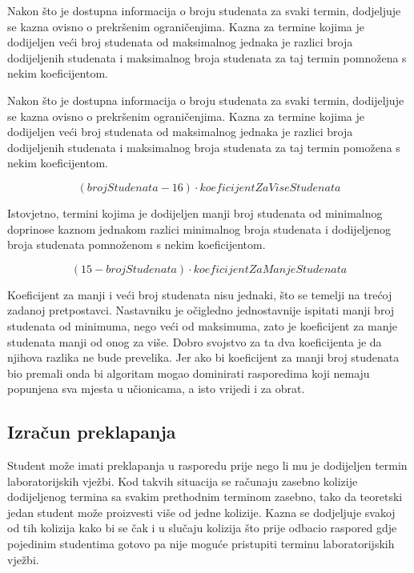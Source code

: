 \documentclass[times, utf8, zavrsni]{fer}
\begin{document}
Nakon što je dostupna informacija o broju studenata za svaki termin, dodjeljuje se kazna ovisno o prekršenim ograničenjima. Kazna za termine kojima je dodijeljen veći broj studenata od maksimalnog jednaka je razlici broja dodijeljenih studenata i maksimalnog broja studenata za taj termin pomnožena s nekim koeficijentom.

Nakon što je dostupna informacija o broju studenata za svaki termin, dodijeljuje se kazna ovisno o prekršenim ograničenjima. Kazna za termine kojima je dodijeljen veći broj studenata od maksimalnog jednaka je razlici broja dodijeljenih studenata i maksimalnog broja studenata za taj termin pomožena s nekim koeficijentom.

\begin{equation}
(brojStudenata - 16) \cdot koeficijentZaViseStudenata
\label{eq:max-studenta}
\end{equation}

Istovjetno, termini kojima je dodijeljen manji broj studenata od minimalnog doprinose kaznom jednakom razlici minimalnog broja studenata i dodijeljenog broja studenata pomnoženom s nekim koeficijentom.

\begin{equation}
(15 - brojStudenata) \cdot koeficijentZaManjeStudenata
\label{eq:min-studenta}
\end{equation}

Koeficijent za manji i veći broj studenata nisu jednaki, što se temelji na trećoj zadanoj pretpostavci. Nastavniku je očigledno jednostavnije ispitati manji broj studenata od minimuma, nego veći od maksimuma, zato je koeficijent za manje studenata manji od onog za više. Dobro svojstvo za ta dva koeficijenta je da njihova razlika ne bude prevelika. Jer ako bi koeficijent za manji broj studenata bio premali onda bi algoritam mogao dominirati rasporedima koji nemaju popunjena sva mjesta u učionicama, a isto vrijedi i za obrat.

\subsection{Izračun preklapanja}

Student može imati preklapanja u rasporedu prije nego li mu je dodijeljen termin laboratorijskih vježbi. Kod takvih situacija se računaju zasebno kolizije dodijeljenog termina sa svakim prethodnim terminom zasebno, tako da teoretski jedan student može proizvesti više od jedne kolizije. Kazna se dodjeljuje svakoj od tih kolizija kako bi se čak i u slučaju kolizija što prije odbacio raspored gdje pojedinim studentima gotovo pa nije moguće pristupiti terminu laboratorijskih vježbi.
\end{document}

